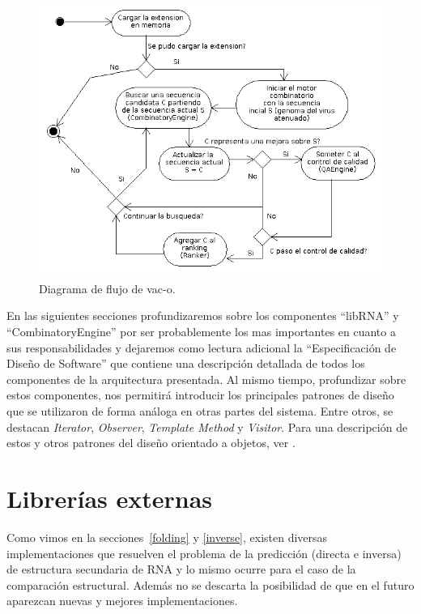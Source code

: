 \begin{figure} 
  \centering
  \includegraphics[scale=0.5]{flow.png}
  \caption{Diagrama de flujo de vac-o.}
\label{flujo}
\end{figure}

En las siguientes secciones profundizaremos sobre los componentes ``libRNA'' y
``CombinatoryEngine'' por ser probablemente los mas importantes en cuanto a sus
responsabilidades y dejaremos como lectura adicional la ``Especificaci\'on de
Dise\~no de Software'' que contiene una descripci\'on detallada de todos los
componentes de la arquitectura presentada. Al mismo tiempo, profundizar sobre
estos componentes, nos permitir\'a introducir los principales patrones de
dise\~no que se utilizaron de forma an\'aloga en otras partes del sistema.
Entre otros, se destacan \textit{Iterator}, \textit{Observer}, \textit{Template
Method} y \textit{Visitor}. Para una descripci\'on de estos y otros patrones
del dise\~no orientado a objetos, ver \cite{Gamma95}.

\section{Librer\'ias externas}
\label{diseno-libRNA}
Como vimos en la secciones~\ref{folding} y \ref{inverse}, existen diversas
implementaciones que resuelven el problema de la predicci\'on (directa e
inversa) de estructura secundaria de \ac{RNA} y lo mismo ocurre para el caso de
la comparaci\'on estructural. Adem\'as no se descarta la posibilidad de que en
el futuro aparezcan nuevas y mejores implementaciones. 

